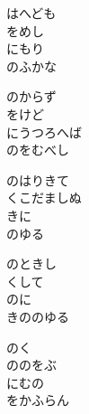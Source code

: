 \documentclass[10pt,b5j]{tarticle} %
\begin{document}
\vspace{1.5em} %
\newcommand{\linespace}{0.5em} %
\newcommand{\blocksize}{0.5\hsize} %
\begin{enumerate} %
    \begin{minipage}[c]{\blocksize}
    
        \vspace{\linespace}
        \item
        はへども\\
        をめし\\
        にもり\\
        のふかな
        
        \vspace{\linespace}
        \item
        のからず\\
        をけど\\
        にうつろへば\\
        のをむべし
        
        \vspace{\linespace}
        \item
        のはりきて\\
        くこだましぬ\\
        きに\\
        のゆる
        
        \vspace{\linespace}
        \item
        のときし\\
        くして\\
        のに\\
        きののゆる
        
        \vspace{\linespace}
        \item
        のく\\
        ののをぶ\\
        にむの\\
        をかふらん
        

\end{minipage}
\end{enumerate}
\end{document}
